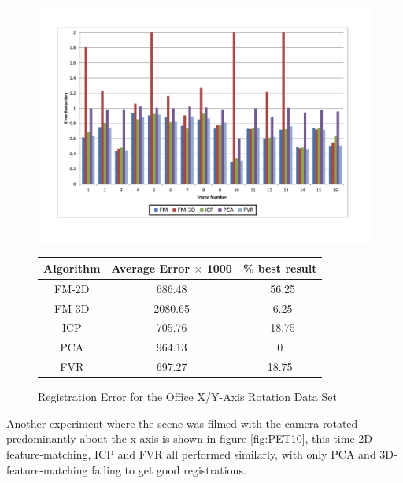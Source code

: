 \begin{figure}
\centering
\includegraphics[width=6in]{images/results/Office_Texture_Rotate_XAxis}
\caption{Registration Error for the Office X/Y-Axis Rotation Data Set}
\label{fig:PET10}

\begin{tabular}{ccc}
\hline
\textbf{Algorithm} & \textbf{Average Error $\times$ 1000} & \textbf{\% best result}\\ \hline
FM-2D	& 686.48 & ~56.25\\
FM-3D	& 2080.65 & ~6.25\\
ICP		& 705.76 & ~18.75\\
PCA		& 964.13 & 0\\
FVR		& 697.27 & 18.75\\
\end{tabular}
\label{tab:PET10ST}
\end{figure} 


Another experiment where the scene was filmed with the camera rotated predominantly about the x-axis is shown in figure \ref{fig:PET10}, this time 2D-feature-matching, ICP and FVR all performed similarly, with only PCA and 3D-feature-matching failing to get good registrations. 

